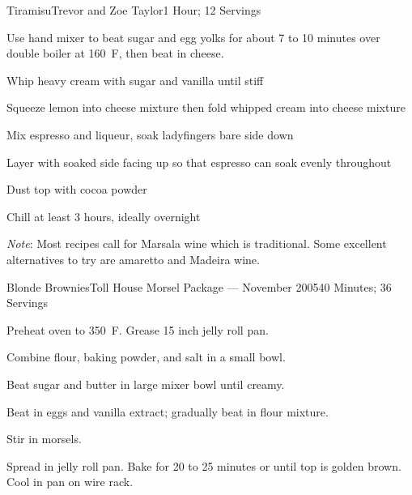\documentclass{article}
\begin{document}
\begin{recipe}{Tiramisu}{Trevor and Zoe Taylor}{1 Hour; 12 Servings}

    Use hand mixer to beat sugar and egg yolks for about 7 to 10 minutes over double
    boiler at 160\ \0F, then beat in cheese.

    Whip heavy cream with sugar and vanilla until stiff

    Squeeze lemon into cheese mixture then fold whipped cream into cheese mixture

    Mix espresso and liqueur, soak ladyfingers bare side down

    \newstep
    Layer with soaked side facing up so that espresso can soak evenly throughout

    Dust top with cocoa powder

    \newstep
    Chill at least 3 hours, ideally overnight

    \freeform
    \emph{Note}: Most recipes call for Marsala wine which is traditional. Some excellent alternatives
    to try are amaretto and Madeira wine.

\end{recipe}

\begin{recipe}{Blonde Brownies}{Toll House Morsel Package --- November 2005}{40 Minutes; 36 Servings}

   \newstep
   Preheat oven to 350\ \0F. Grease 15 inch jelly roll pan.

   Combine flour, baking powder, and salt in a small bowl.

   Beat sugar and butter in large mixer bowl until creamy.

   Beat in eggs and vanilla extract; gradually beat in flour mixture.

   Stir in morsels.

   \newstep
   Spread in jelly roll pan.  Bake for 20 to 25 minutes or until top is golden
   brown.  Cool in pan on wire rack.

\end{recipe}
\end{document}
